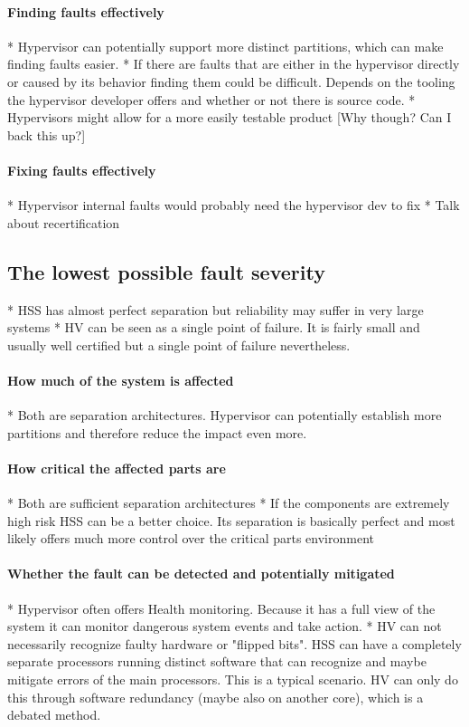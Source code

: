 \paragraph{Finding  faults effectively}
* Hypervisor can potentially support more distinct partitions, which can make finding faults easier. 
* If there are faults that are either in the hypervisor directly or caused by its behavior finding them could be difficult. Depends on the tooling the hypervisor developer offers and whether or not there is source code.
* Hypervisors might allow for a more easily testable product [Why though? Can I back this up?]
\paragraph{Fixing faults effectively}
* Hypervisor internal faults would probably need the hypervisor dev to fix
* Talk about recertification
\subsection{The lowest possible fault severity}
* HSS has almost perfect separation but reliability may suffer in very large systems
* HV can be seen as a single point of failure. It is fairly small and usually well certified but a single point of failure nevertheless. 
\paragraph{How much of the system is affected}
* Both are separation architectures. Hypervisor can potentially establish more partitions and therefore reduce the impact even more.
\paragraph{How critical the affected parts are}
* Both are sufficient separation architectures
* If the components are extremely high risk HSS can be a better choice. Its separation is basically perfect and most likely offers much more control over the critical parts environment
\paragraph{Whether the fault can be detected and potentially mitigated}
* Hypervisor often offers Health monitoring. Because it has a full view of the system it can monitor dangerous system events and take action.
* HV can not necessarily recognize faulty hardware or "flipped bits". HSS can have a completely separate processors running distinct software that can recognize and maybe mitigate errors of the main processors. This is a typical scenario. HV can only do this through software redundancy (maybe also on another core), which is a debated method.

